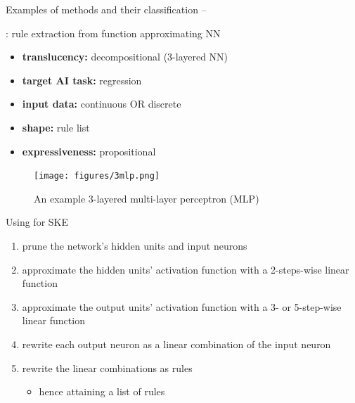 \documentclass[presentation]{beamer}\mode<presentation>{\usetheme{AMSBolognaFC}}
\begin{document}
\begin{frame}[allowframebreaks]{Examples of methods and their classification -- }

    \begin{block}{\textbf{}: rule extraction from function approximating NN}
        \begin{itemize}
            \item \textbf{translucency:} decompositional (3-layered NN)
            \item \textbf{target AI task:} regression
            \item \textbf{input data:} continuous OR discrete
            \item \textbf{shape:} rule list
            \item \textbf{expressiveness:} propositional
        \end{itemize}
    \end{block}

    \framebreak

    \begin{figure}
        \centering
        \texttt{[image: figures/3mlp.png]}
        \caption{An example 3-layered multi-layer perceptron (MLP)}
        \label{fig:3mlp-example}
    \end{figure}

    \framebreak

    \begin{exampleblock}{Using  for SKE}
        \begin{enumerate}
            \item \alert{prune} the network's hidden units and input neurons
            \item approximate the hidden units' activation function with a \alert{2-steps-wise} linear function
            \item approximate the output units' activation function with a \alert{3- or 5-step-wise} linear function
            \item rewrite each output neuron as a \alert{linear combination} of the input neuron
            \item rewrite the linear combinations as rules
            \begin{itemize}
                \item hence attaining a \alert{list of rules}
            \end{itemize}
        \end{enumerate}
    \end{exampleblock}


\end{frame}
\end{document}
